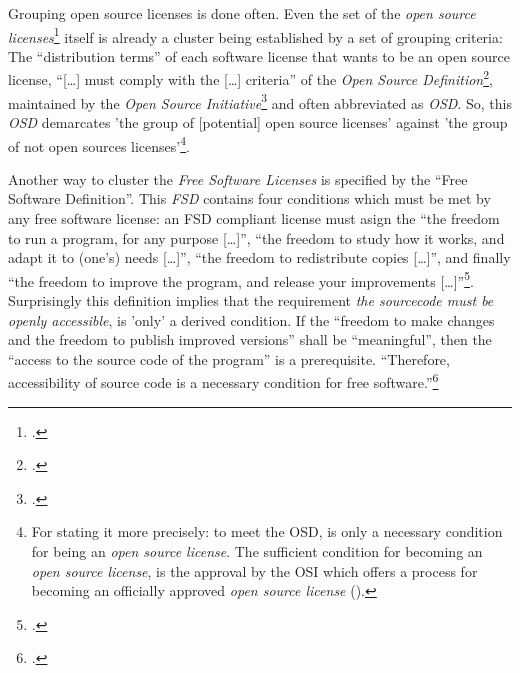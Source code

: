Grouping open source licenses is done often. Even the set of the \emph{open
source li\-cen\-ses}\footcite[cf.][\nopage wp]{OSI2012b} itself is already a
cluster being established by a set of grouping criteria: The
\enquote{distribution terms} of each software license that wants to be an open
source license, \enquote{[\ldots] must comply with the [\ldots] criteria} of the
\emph{Open Source De\-fi\-ni\-tion}\footcite[cf.][\nopage wp]{OSI2012a},
maintained by the \emph{Open Source Initiative}\footcite[cf.][\nopage
wp]{OSI2012c} and often abbreviated as \emph{OSD}. So, this \emph{OSD}
demarcates 'the group of [potential] open source licenses' against 'the group of
not open sources licenses'\footnote{For stating it more precisely: to meet the
OSD, is only a necessary condition for being an \emph{open source license}. The
sufficient condition for becoming an \emph{open source license}, is the approval
by the OSI which offers a process for becoming an officially approved \emph{open
source license} (\cite[cf.][\nopage wp.]{OSI2012d}).}.

Another way to cluster the \emph{Free Software Licenses} is specified by the
\enquote{Free Software Definition}. This \emph{FSD} contains four conditions
which must be met by any free software license: an FSD compliant license must
asign the \enquote{the freedom to run a program, for any purpose [\ldots]},
\enquote{the freedom to study how it works, and adapt it to (one's) needs
[\ldots]}, \enquote{the freedom to redistribute copies [\ldots]}, and finally
\enquote{the freedom to improve the program, and release your improvements
[\ldots]}\footcite[cf.][41]{Stallman1996a}. Surprisingly this definition
implies that the requirement \emph{the sourcecode must be openly accessible},
is 'only' a derived condition. If the \enquote{freedom to make changes and the
freedom to publish improved versions} shall be \enquote{meaningful}, then the
\enquote{access to the source code of the program} is a prerequisite.
\enquote{Therefore, accessibility of source code is a necessary condition for
free software.}\footcite[cf.][41]{Stallman1996a}


